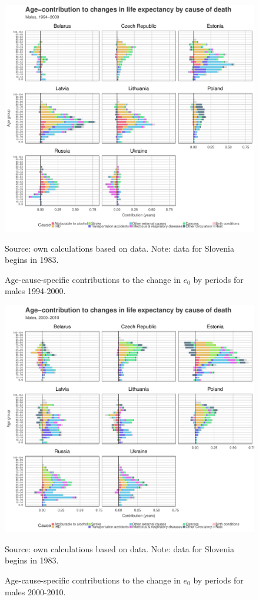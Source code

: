 \documentclass{article}
\begin{document}
\newpage

\begin{figure}[h!]
\caption{Age-cause-specific contributions to the change in $e_0$ by periods for males 1994-2000.}
\centering
\begin{center}
\includegraphics[scale=.5]{Figures/Cause_e0_decomp_Males_1.pdf}
\end{center}
Source: own calculations based on \citet{HMD} data. Note: data for Slovenia begins in 1983.
\end{figure}

\newpage
\begin{figure}[h!]
\caption{Age-cause-specific contributions to the change in $e_0$ by periods for males 2000-2010.}
\centering
\begin{center}
\includegraphics[scale=.5]{Figures/Cause_e0_decomp_Males_2.pdf}
\end{center}
Source: own calculations based on \citet{HMD} data. Note: data for Slovenia begins in 1983.
\end{figure}
\end{document}
